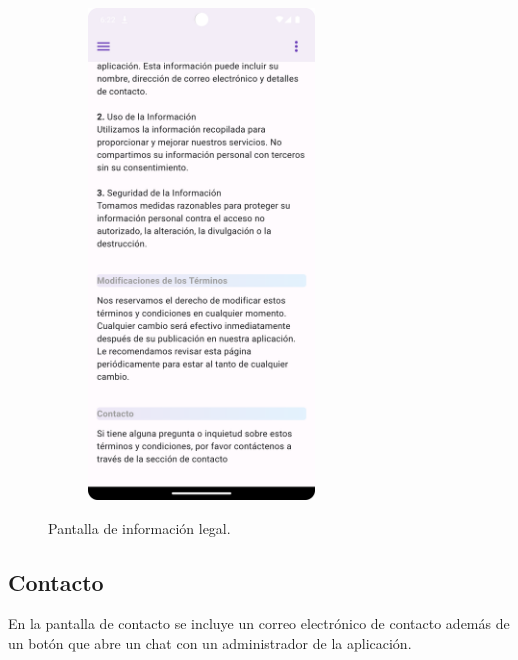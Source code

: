\documentclass[a4paper, 12pt]{article}
\begin{document}
\begin{figure}[H]
\begin{subfigure}{0.48\textwidth}
\begin{center}
			{\includegraphics[width=6cm]{app/LegalPage2.png}\par}
		\end{center}  
	\end{subfigure}\hfill
	\caption{Pantalla de información legal.}
\end{figure}


\newpage
\subsection*{Contacto}

En la pantalla de contacto se incluye un correo electrónico de contacto además de un botón que abre un chat con un administrador de la aplicación.
\end{document}
